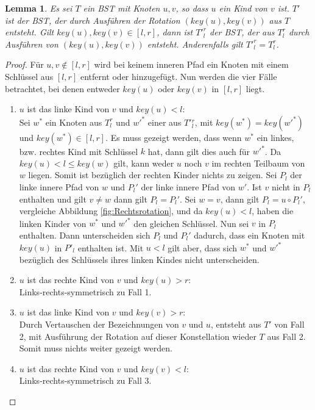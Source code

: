 \documentclass[a4paper,12pt]{article}
\newtheorem{Lemma}{Lemma}[section]
\begin{document}
\begin{Lemma}  \label{lemmaWilber1} Es sei $T$ ein BST mit Knoten $u, v$, so dass $u$ ein Kind von $v$ ist. $T'$ ist der BST, der durch Ausführen der Rotation $\left(\mathit{key}\left(u\right),\mathit{key}\left(v\right)\right)$ aus $T$ entsteht. Gilt $\mathit{key}\left(u\right),\mathit{key}\left(v\right) \in \left[l,r\right]$, dann ist ${T'}^r_l$ der BST, der aus $T^r_l$ durch Ausführen von  $\left(\mathit{key}\left(u\right),\mathit{key}\left(v\right)\right)$ entsteht. Anderenfalls gilt ${T'}^r_l = T^r_l$.
\end{Lemma}
\begin{proof}
	\noindent Für $u,v \notin \left[l,r\right]$ wird bei keinem inneren Pfad ein Knoten mit einem Schlüssel aus $\left[l,r\right]$ entfernt oder hinzugefügt.
	Nun werden die vier Fälle betrachtet, bei denen entweder $\mathit{key}\left(u\right)$ oder $\mathit{key}\left(v\right)$ in $\left[l,r\right]$ liegt.
	\begin{enumerate}
		\item $u$ ist das linke Kind von $v$ und $\mathit{key}\left(u\right) < l$:\\
		Sei $w^*$ ein Knoten aus $T^r_l$ und $w'^*$ einer aus $T'{^r_l}$, mit $\mathit{key}(w^*) = \mathit{key}(w'^*)$ und $\mathit{key}(w^*) \in \left[l,r\right]$. Es muss gezeigt werden, dass wenn $w^*$ ein linkes, bzw. rechtes Kind mit Schlüssel $k$ hat, dann gilt dies auch für $w'^*$. Da $\mathit{key}(u) < l \leq \mathit{key}(w) $ gilt, kann weder $u$ noch $v$ im rechten Teilbaum von $w$ liegen. Somit ist bezüglich der rechten Kinder nichts zu zeigen. 
		Sei $P_l$ der linke innere Pfad von $w$ und $ {P_l}'$ der linke innere Pfad von $w'$. Ist $v$ nicht in $P_l$ enthalten und gilt $v \neq w$ dann gilt $P_l = P{_l}'$. Sei $w = v$, dann gilt $P_l = u  \circ  {P_l}'$, vergleiche Abbildung \ref{fig:Rechtsrotation}, und da $\mathit{key}(u) < l$, haben die linken Kinder von $w^*$ und $w'^*$ den gleichen Schlüssel. Nun sei $v$ in $P_l$ enthalten. Dann unterscheiden sich  $P_l$ und  ${P_l}'$ dadurch, dass ein Knoten mit $\mathit{key}(u)$ in $P'_l$ enthalten ist. Mit $u < l$ gilt aber, dass sich $w^*$ und $w'^*$ bezüglich des Schlüssels ihres linken Kindes nicht unterscheiden.
	   	\item $u$ ist das rechte Kind von $v$ und $\mathit{key}\left(u\right) > r$:\\
	    Links-rechts-symmetrisch zu Fall 1. 	
		\item $u$ ist das linke Kind von $v$ und $\mathit{key}\left(v\right) > r$:\\
		Durch Vertauschen der Bezeichnungen von $v$ und $u$, entsteht aus $T'$ von Fall 2, mit Ausführung der Rotation auf dieser Konstellation wieder $T$ aus Fall 2. Somit muss nichts weiter gezeigt werden. 
		\item $u$ ist das rechte Kind von $v$ und $\mathit{key}\left(v\right) < l$:\\
		Links-rechts-symmetrisch zu Fall 3. \\
		

\end{enumerate}
\end{proof}
\end{document}
